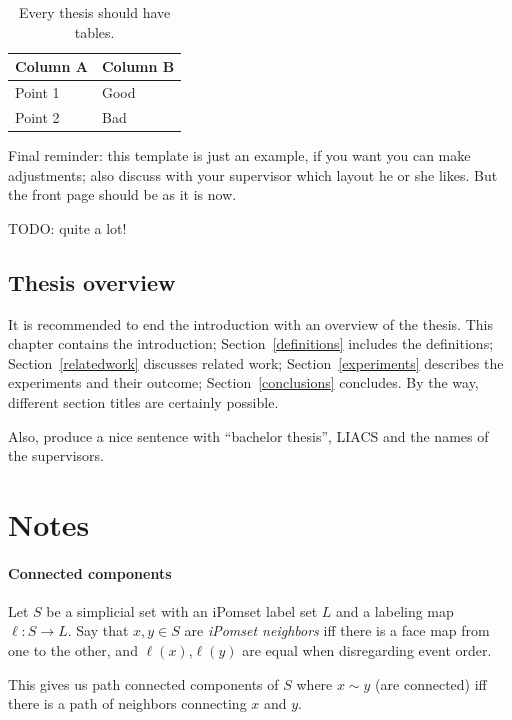 \documentclass[12pt]{article}
\newcommand{\1}{\mathbbm{1}}
\begin{document}
\begin{table}[!htbp]
\begin{center}
\begin{tabular}{l|l}
Column A & Column B\\
\hline
Point 1 & Good\\
Point 2 & Bad
\end{tabular}
\end{center}
\caption{Every thesis should have tables.}\label{atable}
\end{table}

Final reminder: this template is just an example, if you want you can make adjustments; also discuss with your supervisor which layout he or she likes. But the front page should be as it is now.

TODO: quite a lot!

\subsection{Thesis overview}
It is recommended to end the introduction with an overview of the thesis. This chapter contains the introduction; Section~\ref{definitions} includes the definitions; Section~\ref{relatedwork} discusses related work; Section~\ref{experiments} describes the experiments and their outcome; Section~\ref{conclusions} concludes. By the way, different section titles are certainly possible.

Also, produce a nice sentence with ``bachelor thesis'', LIACS and the names of the supervisors.

\section{Notes}\label{notes}
\paragraph{Connected components}
Let $S$ be a simplicial set with an iPomset label set $L$ and a labeling map $\ell: S \rightarrow L$. Say that $x,y\in S$ are \textit{iPomset neighbors} iff there is a face map from one to the other, and $\ell(x)$,$\ell(y)$ are equal when disregarding event order.

This gives us path connected components of $S$ where $x\sim y$ (are connected) iff there is a path of neighbors connecting $x$ and $y$.
\end{document}
